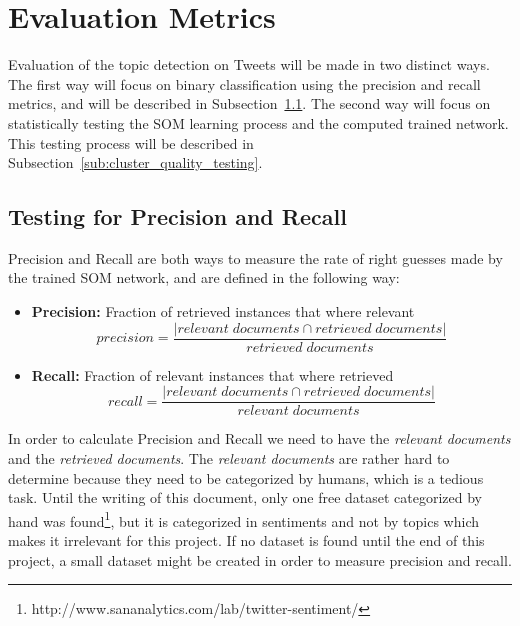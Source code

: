 
\section{Evaluation Metrics} 
\label{sec:evaluation_metrics}
Evaluation of the topic detection on Tweets will be made in two distinct ways. The first way will focus on  binary classification using the precision and recall metrics, and will be described in Subsection~\ref{sub:testing_for_precision_and_recall}. The second way will focus on statistically testing the SOM learning process and the computed trained network. This testing process will be described in Subsection~\ref{sub:cluster_quality_testing}. 

\subsection{Testing for Precision and Recall} 
\label{sub:testing_for_precision_and_recall}
Precision and Recall are both ways to measure the rate of right guesses made by the trained SOM network, and are defined in the following way:
\begin{itemize}
  \item \textbf{Precision:} Fraction of retrieved instances that where relevant 
    \begin{equation}
      precision = \frac{|{relevant\;documents}\cap{retrieved\;documents}|}{{retrieved\;documents}}
    \end{equation} 
  \item \textbf{Recall:} Fraction of relevant instances that where retrieved
   \begin{equation}
      recall = \frac{|{relevant\;documents}\cap{retrieved\;documents}|}{{relevant\;documents}} 
    \end{equation} 
\end{itemize}

In order to calculate Precision and Recall we need to have the \emph{relevant documents} and the \emph{retrieved documents}. The \emph{relevant documents} are rather hard to determine because they need to be categorized by humans, which is a tedious task. Until the writing of this document, only one free dataset categorized by hand was found\footnote{http://www.sananalytics.com/lab/twitter-sentiment/}, but it is categorized in sentiments and not by topics which makes it irrelevant for this project. If no dataset is found until the end of this project, a small dataset might be created in order to measure precision and recall.

